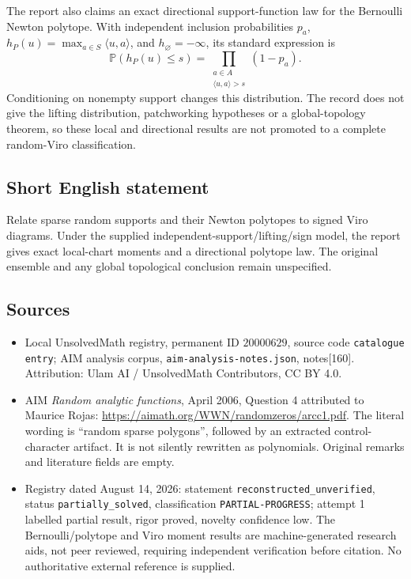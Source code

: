 \documentclass[11pt]{article}
\begin{document}
The report also claims an exact directional support-function law for the Bernoulli Newton polytope. With independent inclusion probabilities \(p_a\), \(h_P(u)=\max_{a\in S}\langle u,a\rangle\), and \(h_\varnothing=-\infty\), its standard expression is
\[
 \mathbb P(h_P(u)\le s)=\prod_{\substack{a\in A\\\langle u,a\rangle>s}}(1-p_a).
\]
Conditioning on nonempty support changes this distribution. The record does not give the lifting distribution, patchworking hypotheses or a global-topology theorem, so these local and directional results are not promoted to a complete random-Viro classification.
\subsection{Short English statement}
Relate sparse random supports and their Newton polytopes to signed Viro diagrams. Under the supplied independent-support/lifting/sign model, the report gives exact local-chart moments and a directional polytope law. The original ensemble and any global topological conclusion remain unspecified.
\subsection{Sources}
\begin{itemize}
\item Local UnsolvedMath registry, permanent ID \(20000629\), source code \texttt{catalogue entry}; AIM analysis corpus, \texttt{aim-analysis-notes.json}, notes[160]. Attribution: Ulam AI / UnsolvedMath Contributors, CC BY 4.0.
\item AIM \emph{Random analytic functions}, April 2006, Question 4 attributed to Maurice Rojas: \url{https://aimath.org/WWN/randomzeros/arcc1.pdf}. The literal wording is ``random sparse polygons'', followed by an extracted control-character artifact. It is not silently rewritten as polynomials. Original remarks and literature fields are empty.
\item Registry dated August 14, 2026: statement \texttt{reconstructed\_unverified}, status \texttt{partially\_solved}, classification \texttt{PARTIAL-PROGRESS}; attempt 1 labelled partial result, rigor proved, novelty confidence low. The Bernoulli/polytope and Viro moment results are machine-generated research aids, not peer reviewed, requiring independent verification before citation. No authoritative external reference is supplied.
\end{itemize}
\end{document}
